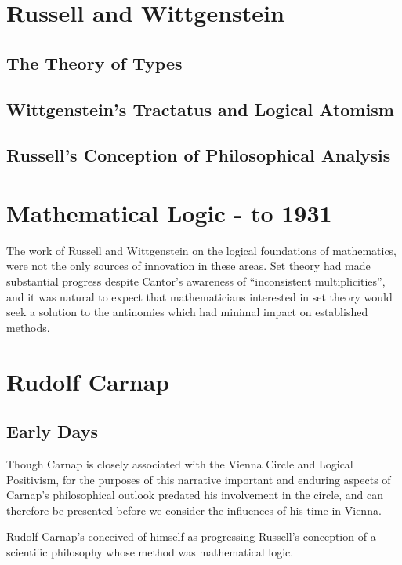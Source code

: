 \chapter{Russell and Wittgenstein}

\section{The Theory of Types}

\section{Wittgenstein's Tractatus and Logical Atomism}

\section{Russell's Conception of Philosophical Analysis}

\chapter{Mathematical Logic - to 1931}

The work of Russell and Wittgenstein on the logical foundations of mathematics, were not the only sources of innovation in these areas.
Set theory had made substantial progress despite Cantor's awareness of ``inconsistent multiplicities'', and it was natural to expect that mathematicians interested in set theory would seek a solution to the antinomies which had minimal impact on established methods.

\chapter{Rudolf Carnap}


\section{Early Days}

Though Carnap is closely associated with the Vienna Circle and Logical Positivism, for the purposes of this narrative important and enduring aspects of Carnap's philosophical outlook predated his involvement in the circle, and can therefore be presented before we consider the influences of his time in Vienna.

Rudolf Carnap's conceived of himself as progressing Russell's conception of a scientific philosophy whose method was mathematical logic.

